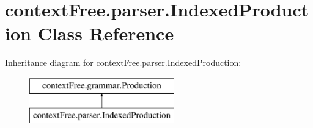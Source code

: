 \hypertarget{classcontext_free_1_1parser_1_1_indexed_production}{\section{context\-Free.\-parser.\-Indexed\-Production Class Reference}
\label{classcontext_free_1_1parser_1_1_indexed_production}
}
Inheritance diagram for context\-Free.\-parser.\-Indexed\-Production\-:\begin{figure}[H]
\begin{center}
\leavevmode
\includegraphics[height=2.000000cm]{classcontext_free_1_1parser_1_1_indexed_production}
\end{center}
\end{figure}
